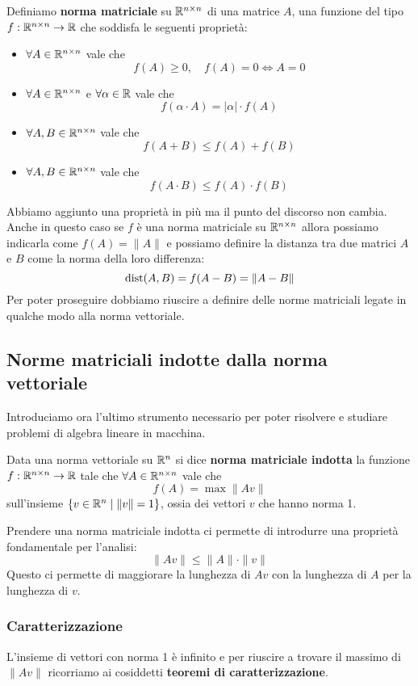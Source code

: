 \begin{definition}
	Definiamo \textbf{norma matriciale} su $\mathbb{R}^{n \times n}$ di una matrice $A$, una funzione del tipo
	$f : \mathbb{R}^{n \times n} \to \mathbb{R}$ che soddisfa le seguenti proprietà:
	\begin{itemize}
		\item $\forall A \in \mathbb{R}^{n \times n}$ vale che
		      \[ f(A) \geq 0, \quad f(A) = 0 \Leftrightarrow A = 0 \]
		\item $\forall A \in \mathbb{R}^{n \times n}$ e $\forall \alpha \in \mathbb{R}$ vale che
		      \[ f(\alpha \cdot A) = |\alpha| \cdot f(A) \]
		\item $\forall A, B \in \mathbb{R}^{n \times n}$ vale che
		      \[ f(A + B) \leq f(A) + f(B) \]
		\item $\forall A, B \in \mathbb{R}^{n \times n}$ vale che
		      \[ f(A \cdot B) \leq f(A) \cdot f(B) \]
	\end{itemize}
\end{definition}

Abbiamo aggiunto una proprietà in più ma il punto del discorso non cambia. Anche in questo caso se $f$ è una
norma matriciale su $\mathbb{R}^{n \times n}$ allora possiamo indicarla come $f(A) = \| A \|$ e possiamo definire la
distanza tra due matrici $A$ e $B$ come la norma della loro differenza:
\[ \operatorname{dist}(A, B) = f(A - B) = \| A - B \| \]
Per poter proseguire dobbiamo riuscire a definire delle norme matriciali legate in qualche modo alla norma
vettoriale.

\subsection{Norme matriciali indotte dalla norma vettoriale}
Introduciamo ora l'ultimo strumento necessario per poter risolvere e studiare problemi di algebra lineare in
macchina.
\begin{definition}
	Data una norma vettoriale su $\mathbb{R}^n$ si dice \textbf{norma matriciale indotta} la funzione
	$f : \mathbb{R}^{n \times n} \to \mathbb{R}$ tale che $\forall A \in \mathbb{R}^{n \times n}$ vale che
	\[ f(A) = \max \| A v \| \]
	sull'insieme $\{ v \in \mathbb{R}^n \mid \| v \| = 1 \}$, ossia dei vettori $v$ che hanno norma 1.
\end{definition}

Prendere una norma matriciale indotta ci permette di introdurre una proprietà fondamentale per l'analisi:
\[ \| A v \| \leq \| A \| \cdot \| v \| \]
Questo ci permette di maggiorare la lunghezza di $A v$ con la lunghezza di $A$ per la lunghezza di $v$.

\subsubsection{Caratterizzazione}
L'insieme di vettori con norma 1 è infinito e per riuscire a trovare il massimo di $\| A v \|$ ricorriamo ai
cosiddetti \textbf{teoremi di caratterizzazione}.
